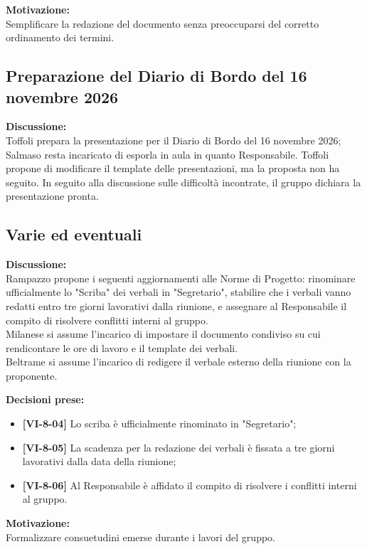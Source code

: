 \documentclass[12pt,a4paper]{article}
\newcommand{\tightlist}{\setlength{\itemsep}{1pt}\setlength{\parskip}{0pt}}
\begin{document}
\textbf{Motivazione:} \\
Semplificare la redazione del documento senza preoccuparsi del corretto ordinamento dei termini.

\hypertarget{odg-4}{%
\subsection{Preparazione del Diario di Bordo del 16 novembre 2026}}
\textbf{Discussione:} \\
Toffoli prepara la presentazione per il Diario di Bordo del 16 novembre 2026; Salmaso resta incaricato di esporla in aula in quanto Responsabile. Toffoli propone di modificare il template delle presentazioni, ma la proposta non ha seguito.
In seguito alla discussione sulle difficoltà incontrate, il gruppo dichiara la presentazione pronta.

\hypertarget{varie-ed-eventuali}{%
\subsection{Varie ed eventuali}}
\textbf{Discussione:} \\
Rampazzo propone i seguenti aggiornamenti alle Norme di Progetto: rinominare ufficialmente lo "Scriba" dei verbali in "Segretario", stabilire che i verbali vanno redatti entro tre giorni lavorativi dalla riunione, e assegnare al Responsabile il compito di risolvere conflitti interni al gruppo. \\
Milanese si assume l'incarico di impostare il documento condiviso su cui rendicontare le ore di lavoro e il template dei verbali. \\
Beltrame si assume l'incarico di redigere il verbale esterno della riunione con la proponente.

\textbf{Decisioni prese:}
\begin{itemize}
\tightlist
\item[$\checkmark$] \textbf{[VI-8-04]} Lo scriba è ufficialmente rinominato in "Segretario";
\item[$\checkmark$] \textbf{[VI-8-05]} La scadenza per la redazione dei verbali è fissata a tre giorni lavorativi dalla data della riunione;
\item[$\checkmark$] \textbf{[VI-8-06]} Al Responsabile è affidato il compito di risolvere i conflitti interni al gruppo.
\end{itemize}

\textbf{Motivazione:} \\
Formalizzare consuetudini emerse durante i lavori del gruppo.
\end{document}
